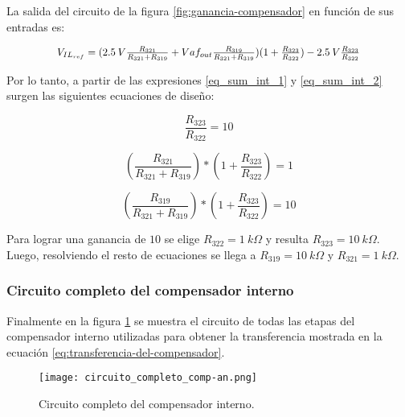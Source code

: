 La salida del circuito de la figura \ref{fig:ganancia-compensador} en función de sus entradas es:

\begin{equation}\label{eq_sum_int_2}
	\resizebox{.8\hsize}{!}
	{
		$
		V_{IL_{ref}}=(2.5\:V\frac{R_{321}}{R_{321}+R_{319}}+Vaf_{out}\frac{R_{319}}{R_{321}+R_{319}})(1+\frac{R_{323}}{R_{322}})-2.5\:V\frac{R_{323}}{R_{322}}
		$
	}
\end{equation}

Por lo tanto, a partir de las expresiones \ref{eq_sum_int_1} y \ref{eq_sum_int_2} surgen las siguientes ecuaciones de diseño:

\begin{equation}
	\frac{R_{323}}{R_{322}}=10
\end{equation}

\begin{equation} 
	(\frac{R_{321}}{R_{321}+R_{319}})*(1+\frac{R_{323}}{R_{322}}) = 1
\end{equation}

\begin{equation} 
(\frac{R_{319}}{R_{321}+R_{319}})*(1+\frac{R_{323}}{R_{322}}) = 10
\end{equation}

Para lograr una ganancia de $10$ se elige $R_{322} = 1\:k\Omega$ y resulta $R_{323} = 10\:k\Omega$. Luego, resolviendo el resto de ecuaciones se llega a $R_{319}=10\:k\Omega$ y $R_{321}=1\:k\Omega$.


\subsubsection{Circuito completo del compensador interno}

Finalmente en la figura \ref{fig:circuito_completo_comp_int} se muestra el circuito de todas las etapas del compensador interno utilizadas para obtener la transferencia mostrada en la ecuación \ref{eq:transferencia-del-compensador}.


\begin{figure}[H]
	\centering
	\texttt{[image: circuito\_completo\_comp-an.png]}
	\caption{Circuito completo del compensador interno.}
	\label{fig:circuito_completo_comp_int}
\end{figure}